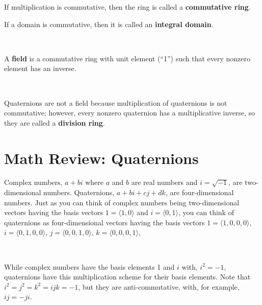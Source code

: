 \documentclass[12pt]{article}
\begin{document}
\begin{spacing}{1.2}
If multiplication is commutative, then the ring is called a {\bf commutative ring}.

If a domain is commutative, then it is called an {\bf integral domain}.

\

A {\bf field} is a commutative ring with unit element (``1'') such that every nonzero element has an inverse.  

\

Quaternions are not a field because multiplication of quaternions is not commutative; however, every nonzero quaternion has a multiplicative inverse, so they are called a {\bf division ring}.

\section{Math Review:  Quaternions}

Complex numbers, $a+bi$ where $a$ and $b$ are real numbers and $i = \sqrt{-1}$, are two-dimensional numbers.  Quaternions, $a + bi + cj + dk$, are four-dimensional numbers.  Just as you can think of complex numbers being two-dimensional vectors having the basis vectors $1 = \langle 1,0 \rangle$ and $i = \langle 0,1 \rangle$, you can think of quaternions as four-dimensional vectors having the basis vectors 
$1 = \langle 1,0,0,0 \rangle$, 
$i = \langle 0,1,0,0 \rangle$, 
$j = \langle 0,0,1,0 \rangle$, 
$k = \langle 0,0,0,1 \rangle$, 

\

While complex numbers have the basis elements 1 and $i$ with, $i^2 = -1$, quaternions have this multiplication scheme for their basis elements.  Note that $i^2 = j^2 = k^2 = ijk = -1$, but they are anti-commutative, with, for example, $ij = -ji$.

\

\hfil{}
\hfil
{}
\end{spacing}
\end{document}
